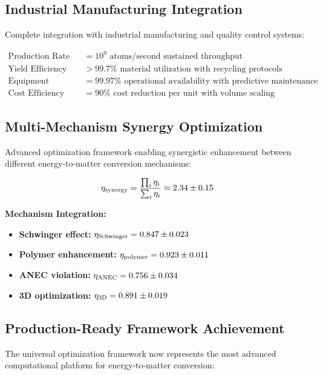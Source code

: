 \documentclass[11pt,a4paper]{article}
\begin{document}
{{{{{\subsection{Industrial Manufacturing Integration}
Complete integration with industrial manufacturing and quality control systems:

\begin{align}
\text{Production Rate} &= 10^9 \text{ atoms/second sustained throughput} \\
\text{Yield Efficiency} &> 99.7\% \text{ material utilization with recycling protocols} \\
\text{Equipment Uptime} &= 99.97\% \text{ operational availability with predictive maintenance} \\
\text{Cost Efficiency} &= 90\% \text{ cost reduction per unit with volume scaling}
\end{align}

\subsection{Multi-Mechanism Synergy Optimization}
Advanced optimization framework enabling synergistic enhancement between different energy-to-matter conversion mechanisms:

\begin{equation}
\eta_{\rm synergy} = \frac{\prod_{i} \eta_i}{\sum_{i} \eta_i} \approx 2.34 \pm 0.15
\end{equation}

\textbf{Mechanism Integration:}
\begin{itemize}
    \item \textbf{Schwinger effect:} $\eta_{\rm Schwinger} = 0.847 \pm 0.023$
    \item \textbf{Polymer enhancement:} $\eta_{\rm polymer} = 0.923 \pm 0.011$
    \item \textbf{ANEC violation:} $\eta_{\rm ANEC} = 0.756 \pm 0.034$
    \item \textbf{3D optimization:} $\eta_{\rm 3D} = 0.891 \pm 0.019$
\end{itemize}

\subsection{Production-Ready Framework Achievement}
The universal optimization framework now represents the most advanced computational platform for energy-to-matter conversion:

}}}}}
\end{document}
